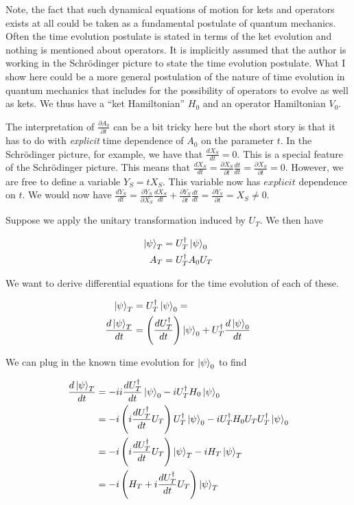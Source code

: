 \documentclass[12pt]{article}
\newcommand{\ddt}[1]{\frac{d #1}{dt}}
\begin{document}
Note, the fact that such dynamical equations of motion for kets and operators exists at all could be taken as a fundamental postulate of quantum mechanics. Often the time evolution postulate is stated in terms of the ket evolution and nothing is mentioned about operators. It is implicitly assumed that the author is working in the Schr{\"o}dinger picture to state the time evolution postulate. What I show here could be a more general postulation of the nature of time evolution in quantum mechanics that includes for the possibility of operators to evolve as well as kets. We thus have a ``ket Hamiltonian'' $H_0$ and an operator Hamiltonian $V_0$.

The interpretation of $\frac{\partial A_0}{\partial t}$ can be a bit tricky here but the short story is that it has to do with \textit{explicit} time dependence of $A_0$ on the parameter $t$. In the Schr{\"o}dinger picture, for example, we have that $\ddt{X_S} = 0$. This is a special feature of the Schr{\"o}dinger picture. This means that $\ddt{X_S} = \frac{\partial X_S}{\partial t} \ddt{t} = \frac{\partial X_S}{\partial t} =  0$. However, we are free to define a variable $Y_S = t X_S$. This variable now has $\textit{explicit}$ dependence on $t$. We would now have $\ddt{Y_S} = \frac{\partial{Y_S}}{\partial X_S} \ddt{X_S} + \frac{\partial{Y_S}}{\partial t} \ddt{t} = \frac{\partial Y_S}{\partial t}= X_S \neq 0$.

Suppose we apply the unitary transformation induced by $U_T$. We then have

\begin{align}
\ket{\psi}_T &= U_T^{\dag} \ket{\psi}_0\\
A_T &= U_T^{\dag} A_0 U_T
\end{align}

We want to derive differential equations for the time evolution of each of these.

\begin{align}
\ket{\psi}_T &= U_T^{\dag}\ket{\psi}_0 =\\
\ddt{\ket{\psi}_T} &= \left(\ddt{U_T^{\dag}} \right) \ket{\psi}_0 + U_T^{\dag} \ddt{\ket{\psi}_0}
\end{align}

We can plug in the known time evolution for $\ket{\psi}_0$ to find

\begin{align}
\ddt{\ket{\psi}_T} &= -i i\ddt{U_T^{\dag}} \ket{\psi}_0 -i U_T^{\dag} H_0 \ket{\psi}_0\\
&= -i \left(i\ddt{U_T^{\dag}} U_T\right) U_T^{\dag} \ket{\psi}_0 -i U_T^{\dag} H_0U_TU_T^{\dag} \ket{\psi}_0\\
&= -i \left(i\ddt{U_T^{\dag}} U_T\right) \ket{\psi}_T - i H_T \ket{\psi}_T\\
&= -i \left(H_T + i \ddt{U_T^{\dag}} U_T\right)\ket{\psi}_T
\end{align}
\end{document}
